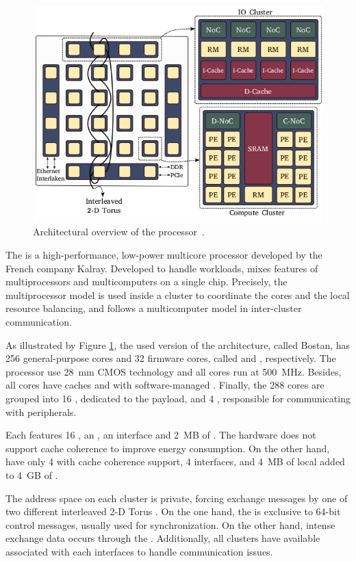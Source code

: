 		\begin{figure}[h]
			\centering
			\includegraphics[width=.7\textwidth]{images/arch-mppa.png}

			\caption{
				Architectural overview of the \mppa processor~\cite{Penna2018}.
			}\par
			\label{fig.mppa-arch}
		\end{figure}

		The \mppa is a high-performance, low-power multicore processor
		developed by the French company Kalray.
		Developed to handle \mimd workloads, \mppa mixes features of
		multiprocessors and multicomputers on a single chip.
		Precisely, the multiprocessor model is used inside a cluster
		to coordinate the cores and the local resource balancing, and
		follows a multicomputer model in inter-cluster communication.

		As illustrated by Figure \ref{fig.mppa-arch}, the used version of
		the architecture, called Bostan, has 256 general-purpose cores and
		32 firmware cores, called \pes and \rmans, respectively.
		The processor use 28~mm CMOS technology and all cores run at 500~MHz.
		Besides, all cores have caches and \mmus with software-managed \tlbs.
		Finally, the 288 cores are grouped into 16 \cclusters, dedicated to
		the payload, and 4 \ioclusters, responsible for communicating with peripherals.

		Each \ccluster features 16 \pes, an \rman, an \noc interface and 2~MB of \sram.
		The hardware does not support cache coherence to improve energy consumption.
		On the other hand, \ioclusters have only 4 \rmans with cache coherence support,
		4 \noc interfaces, and 4~MB of local \sram added to 4~GB of \dram.

		The address space on each cluster is private, forcing exchange messages
		by one of two different interleaved 2-D Torus \nocs.
		On the one hand, the \cnoc is exclusive to 64-bit control messages,
		usually used for synchronization.
		On the other hand, intense exchange data occurs through the \dnoc.
		Additionally, all clusters have available \dmas associated with each
		\noc interfaces to handle communication issues.

